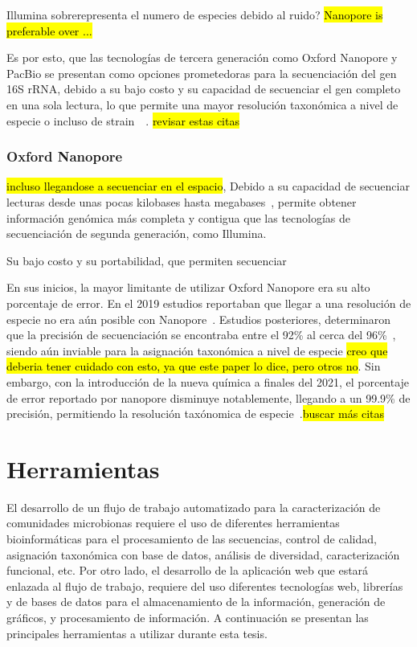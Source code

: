 Illumina sobrerepresenta el numero de especies debido al ruido? \hl{Nanopore is preferable over ...}

Es por esto, que las tecnologías de tercera generación como Oxford Nanopore y PacBio se presentan como opciones prometedoras para la secuenciación del gen 16S rRNA, debido a su bajo costo y su capacidad de secuenciar el gen completo en una sola lectura, lo que permite una mayor resolución taxonómica a nivel de especie o incluso de strain~\cite{szoboszlay2023nanopore}~\cite{urban2021freshwater,delahaye2021sequencing}. \hl{revisar estas citas}

\subsubsection{Oxford Nanopore}
\hl{incluso llegandose a secuenciar en el espacio},
Debido a su capacidad de secuenciar lecturas desde unas pocas kilobases hasta megabases~\cite{amarasinghe2020opportunities}, permite obtener información genómica más completa y contigua que las tecnologías de secuenciación de segunda generación, como Illumina.

Su bajo costo y su portabilidad, que permiten secuenciar 

En sus inicios, la mayor limitante de utilizar Oxford Nanopore era su alto porcentaje de error. En el 2019 estudios reportaban que llegar a una resolución de especie no era aún posible con Nanopore~\cite{winand2019targeting}. Estudios posteriores, determinaron que la precisión de secuenciación se encontraba entre el 92\% al cerca del 96\%~\cite{urban2021freshwater,delahaye2021sequencing}, siendo aún inviable para la asignación taxonómica a nivel de especie \hl{creo que deberia tener cuidado con esto, ya que este paper lo dice, pero otros no}. Sin embargo, con la introducción de la nueva química a finales del 2021, el porcentaje de error reportado por nanopore disminuye notablemente, llegando a un 99.9\% de precisión, permitiendo la resolución taxónomica de especie~\cite{yoon2017introducing}.\hl{buscar más citas}


\section{Herramientas}
El desarrollo de un flujo de trabajo automatizado para la caracterización de comunidades microbionas requiere el uso de diferentes herramientas bioinformáticas para el procesamiento de las secuencias, control de calidad, asignación taxonómica con base de datos, análisis de diversidad, caracterización funcional, etc. Por otro lado, el desarrollo de la aplicación web que estará enlazada al flujo de trabajo, requiere del uso diferentes tecnologías web, librerías y de bases de datos para el almacenamiento de la información, generación de gráficos, y procesamiento de información. A continuación se presentan las principales herramientas a utilizar durante esta tesis.
